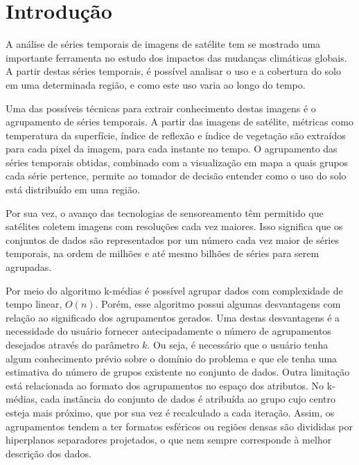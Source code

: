 \section{Introdução} \label{sec:introducao}

A análise de séries temporais de imagens de satélite tem se mostrado
uma importante ferramenta no estudo dos impactos das mudanças climáticas
globais. A partir destas séries temporais, é possível analisar o uso e 
a cobertura do solo em uma determinada região, e como este uso varia ao longo
do tempo.

Uma das possíveis técnicas para extrair conhecimento destas imagens é o 
agrupamento de séries temporais. A partir das imagens de satélite, métricas
como temperatura da superfície, índice de reflexão e índice de vegetação são
extraídos para cada pixel da imagem, para cada instante no tempo. O agrupamento
das séries temporais obtidas, combinado com a visualização em mapa a quais grupos
cada série pertence, permite ao tomador de decisão entender como o uso do solo
está distribuído em uma região.

Por sua vez, o avanço das tecnologias de sensoreamento têm permitido que satélites
coletem imagens com resoluções cada vez maiores. Isso significa que os conjuntos
de dados são representados por um número cada vez maior de séries temporais, na
ordem de milhões e até mesmo bilhões de séries para serem agrupadas.

Por meio do algoritmo k-médias é possível agrupar dados com complexidade de tempo linear, $O(n)$.
Porém, esse algoritmo possui algumas desvantagens com relação ao significado
dos agrupamentos gerados. Uma destas desvantagens é a necessidade do usuário
fornecer antecipadamente o número de agrupamentos desejados através do 
parâmetro $k$. Ou seja, é necessário que o usuário tenha algum conhecimento
prévio sobre o domínio do problema e que ele tenha uma estimativa do número de 
grupos existente no conjunto de dados. Outra limitação está relacionada ao formato dos
agrupamentos no espaço dos atributos. No k-médias, cada instância
do conjunto de dados é atribuída ao grupo cujo centro esteja mais próximo, que 
por sua vez é recalculado a cada iteração. Assim, os agrupamentos tendem a ter formatos
esféricos ou regiões densas são divididas por hiperplanos separadores projetados, o que
nem sempre corresponde à melhor descrição dos dados.

